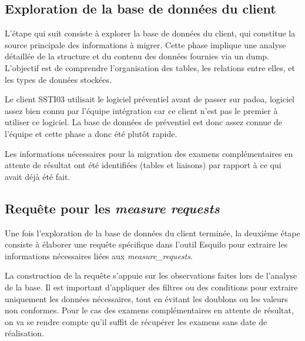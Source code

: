 \subsection{Exploration de la base de données du client}

L'étape qui suit consiste à explorer la base de données du client, qui constitue la source principale des informations à migrer. Cette phase implique une analyse détaillée de la structure et du contenu des données fournies via un dump. L'objectif est de comprendre l'organisation des tables, les relations entre elles, et les types de données stockées. 

Le client SSTI03 utilisait le logiciel préventiel avant de passer sur padoa, logiciel assez bien connu par l'équipe intégration car ce client n'est pas le premier à utiliser ce logiciel. La base de données de préventiel est donc assez connue de l'équipe et cette phase a donc été plutôt rapide.

Les informations nécessaires pour la migration des examens complémentaires en attente de résultat ont été identifiées (tables et liaisons) par rapport à ce qui avait déjà été fait.


\subsection{Requête pour les \textit{measure requests}}

Une fois l’exploration de la base de données du client terminée, la deuxième étape consiste à élaborer une requête spécifique dans l’outil Esquilo pour extraire les informations nécessaires liées aux \textit{measure\_requests}. 

La construction de la requête s’appuie sur les observations faites lors de l’analyse de la base. Il est important d’appliquer des filtres ou des conditions pour extraire uniquement les données nécessaires, tout en évitant les doublons ou les valeurs non conformes. Pour le cas des examens complémentaires en attente de résultat, on va se rendre compte qu'il suffit de récupérer les examens sans date de réalisation.

